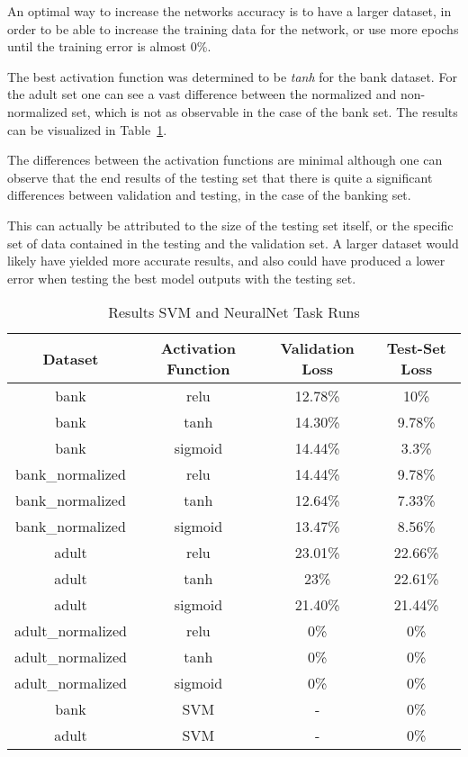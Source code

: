 \documentclass[12pt]{article}
\begin{document}
An optimal way to increase the networks accuracy is to have a larger dataset, in order to be able to increase the training data for the network, or use more epochs until the training error is almost 0\%.

The best activation function was determined to be \emph{tanh} for the bank dataset. For the adult set one can see a vast difference between the normalized and non-normalized set, which is not as observable in the case of the bank set. The results can be visualized in Table~\ref{tab:taskRuns}. 

The differences between the activation functions are minimal although one can observe that the end results of the testing set that there is quite a significant differences between validation and testing, in the case of the banking set. 

This can actually be attributed to the size of the testing set itself, or the specific set of data contained in the testing and the validation set. A larger dataset would likely have yielded more accurate results, and also could have produced a lower error when testing the best model outputs with the testing set.

\begin{table}[ht]
    \centering
    \caption{Results SVM and NeuralNet Task Runs\protect\footnotemark}
    \label{tab:taskRuns}
    \begin{tabular}{cccc}\toprule
        Dataset & Activation Function & Validation Loss & Test-Set Loss \\
        \midrule
        bank & relu & 12.78\% & 10\%  \\
        bank & tanh & 14.30\% & 9.78\% \\
        bank & sigmoid & 14.44\% & 3.3\% \\
        bank\_normalized & relu & 14.44\% & 9.78\%  \\
        bank\_normalized & tanh & 12.64\% & 7.33\% \\
        bank\_normalized & sigmoid & 13.47\% & 8.56\% \\
        adult & relu & 23.01\% & 22.66\% \\
        adult & tanh & 23\% & 22.61\% \\
        adult & sigmoid & 21.40\% & 21.44\% \\
        adult\_normalized & relu & 0\% & 0\% \\
        adult\_normalized & tanh & 0\% & 0\% \\
        adult\_normalized & sigmoid & 0\% & 0\% \\
        bank & SVM & - & 0\% \\
        adult & SVM & - & 0\% \\
    \end{tabular}
\end{table}
\end{document}
